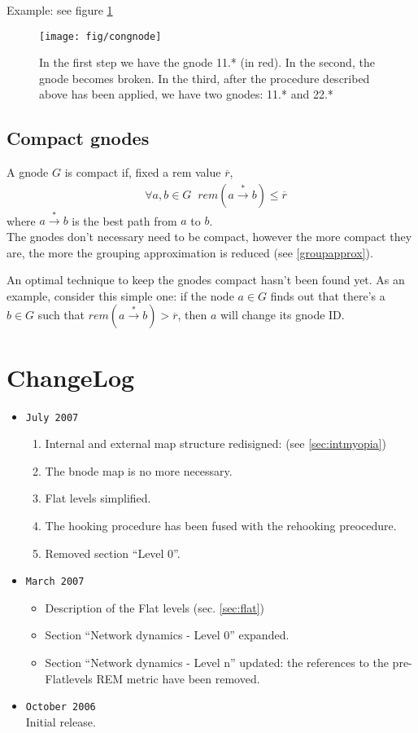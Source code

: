 \documentclass[a4paper]{article}
\newcommand{\eal}[1]{{\begin{align*} #1 \end{align*}}}
\def\ove#1{{\overline{#1}}}
\begin{document}
Example: see figure \ref{fig:congnode}
\begin{figure}[h]
	\begin{center}
		\texttt{[image: fig/congnode]}
	\end{center}
	\caption{In the first step we have the gnode 11.* (in red). In the
	second, the gnode becomes broken. In the third, after the procedure
	described above has been applied, we have two gnodes: 11.* and 22.*}
	\label{fig:congnode}
\end{figure}
\newpage

\subsection{Compact gnodes}
A gnode $G$ is compact if, fixed a rem value $\ove r$, 
\eal{&\forall a,b\in G\;\;rem(a\stackrel{*}{\rightarrow} b)\le \ove r}
where $a\stackrel{*}{\rightarrow} b$ is the best path from $a$ to $b$.\\
The gnodes don't necessary need to be compact, however the more compact they
are, the more the grouping approximation is reduced (see \ref{groupapprox}).

An optimal technique to keep the gnodes compact hasn't been found yet. As an
example, consider this simple one: if the node $a\in G$ finds out that there's
a $b\in G$ such that $rem(a\stackrel{*}{\rightarrow} b) > \ove r$, then $a$
will change its gnode ID.

\section{ChangeLog}
\begin{itemize}
	\item \verb|July 2007|
		\begin{enumerate}
			\item Internal and external map structure redisigned:
				(see \ref{sec:intmyopia})
			\item The bnode map is no more necessary.
			\item Flat levels simplified.
			\item The hooking procedure has been fused with the
				rehooking preocedure.
			\item Removed section ``Level 0''.
		\end{enumerate}
	\item \verb|March 2007|
		\begin{itemize}
			\item Description of the Flat levels (sec. \ref{sec:flat})
			\item Section ``Network dynamics - Level 0'' expanded.
			\item Section ``Network
				dynamics - Level n'' updated: the references to
				the pre-Flatlevels REM metric have been
				removed.
		\end{itemize}
	\item \verb|October 2006|\\
		Initial release.
\end{itemize}
\end{document}
